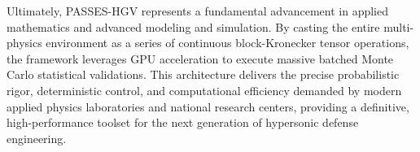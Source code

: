 \documentclass[11pt,a4paper]{article}
\theoremstyle{definition}
\numberwithin{equation}{section}
\begin{document}
Ultimately, PASSES-HGV represents a fundamental advancement in applied mathematics and advanced modeling and simulation. By casting the entire multi-physics environment as a series of continuous block-Kronecker tensor operations, the framework leverages GPU acceleration to execute massive batched Monte Carlo statistical validations. This architecture delivers the precise probabilistic rigor, deterministic control, and computational efficiency demanded by modern applied physics laboratories and national research centers, providing a definitive, high-performance toolset for the next generation of hypersonic defense engineering.


\pagebreak

\printbibliography

\pagebreak

\begin{appendices}

\end{appendices}
\end{document}
